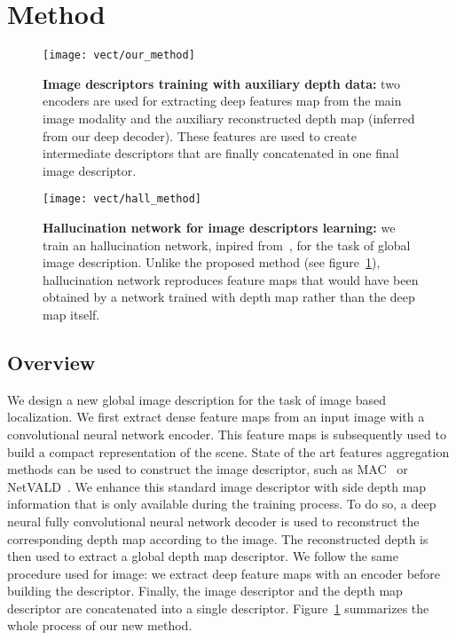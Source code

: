 \section{Method}
\label{sec:method}

\begin{figure}
	\center
	\texttt{[image: vect/our\_method]}
	\caption{\label{fig:our_method} \textbf{Image descriptors training with auxiliary depth data:} two encoders are used for extracting deep features map from the main image modality and the auxiliary reconstructed depth map (inferred from our deep decoder). These features are used to create intermediate descriptors that are finally concatenated in one final image descriptor.}
\end{figure}

\begin{figure}
	\center
	\texttt{[image: vect/hall\_method]}
	\caption{\label{fig:hall_method} \textbf{Hallucination network for image descriptors learning:} we train an hallucination network, inpired from~\cite{Hoffman2016}, for the task of global image description. Unlike the proposed method (see figure~\ref{fig:our_method}), hallucination network reproduces feature maps that would have been obtained by a network trained with depth map rather than the deep map itself.}
\end{figure}



\subsection{Overview}
\label{subsec:overview}
We design a new global image description for the task of image based localization. We first extract dense feature maps from an input image with a convolutional neural network encoder. This feature maps is subsequently used to build a compact representation of the scene. State of the art features aggregation methods can be used to construct the image descriptor, such as MAC~\cite{Radenovic2017} or NetVALD~\cite{Arandjelovic2017}. We enhance this standard image descriptor with side depth map information that is only available during the training process. To do so, a deep neural fully convolutional neural network decoder is used to reconstruct the corresponding depth map according to the image. The reconstructed depth is then used to extract a global depth map descriptor. We follow the same procedure used for image: we extract deep feature maps with an encoder before building the descriptor. Finally, the image descriptor and the depth map descriptor are concatenated into a single descriptor. Figure~\ref{fig:our_method} summarizes the whole process of our new method.

